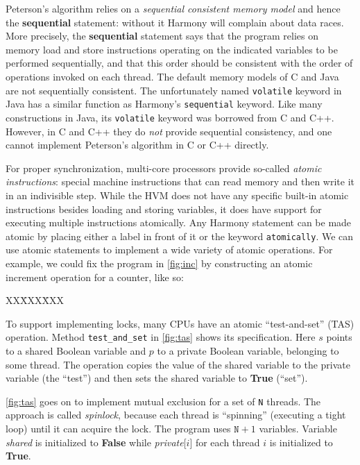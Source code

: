 \documentclass{report}
\newcommand{\harmonysource}[1]{
\begin{tabbing}
XX\=XXX\=XXX\kill
    
\end{tabbing}
}
\newenvironment{code}{
\tcolorbox
}{
\endtcolorbox
}
\begin{document}
Peterson's algorithm relies on a \emph{sequential consistent memory model}
and hence the \textbf{sequential} statement: without it Harmony will
complain about data races.
More precisely, the \textbf{sequential} statement says that the
program relies on memory load and store instructions operating on
the indicated variables to be performed sequentially, and that this
order should be consistent with the order of operations invoked on each
thread.
The default memory models of C and Java are not sequentially
consistent.
The unfortunately named \texttt{volatile} keyword in Java has
a similar function as Harmony's \texttt{sequential} keyword.
Like many constructions in Java, its \texttt{volatile} keyword
was borrowed from C and C++.
However, in C and C++ they do \emph{not} provide sequential
consistency, and one cannot implement Peterson's algorithm in
C or C++ directly.

%
For proper synchronization, multi-core processors provide so-called
\emph{atomic instructions}: %
special machine instructions
that can read memory and then write it in an indivisible step.
%
While the HVM does not have any specific built-in atomic instructions
besides loading and storing variables,
it does have support for executing multiple instructions atomically.
Any Harmony statement can be made atomic by placing either a label in front
of it or the keyword \texttt{atomically}.
We can use atomic statements to implement a wide variety of
atomic operations.
For example, we could fix the program in \autoref{fig:inc} by
constructing an atomic increment operation for a counter, like so:
\begin{code}
\harmonysource{atomicinc}
\end{code}

To support implementing locks,
many CPUs have an atomic ``test-and-set'' (TAS)
%
%
operation.
Method \texttt{test\_and\_set} in \autoref{fig:tas} shows its specification.
Here $s$ points to a shared Boolean variable and $p$
to a private Boolean variable, belonging to some thread.
The operation copies the value of the shared variable to the
private variable (the ``test'')
and then sets the shared variable to \textbf{True} (``set'').

\autoref{fig:tas} goes on to implement mutual exclusion for
a set of \texttt{N} threads.
The approach is called \emph{spinlock},
%
because each thread is ``spinning'' (executing a tight loop) until
it can acquire the lock.
The program uses $\mathtt{N}+1$ variables.
Variable \textit{shared} is initialized to \textbf{False} while
\textit{private}[$i$] for each thread $i$ is initialized to \textbf{True}.
\end{document}
